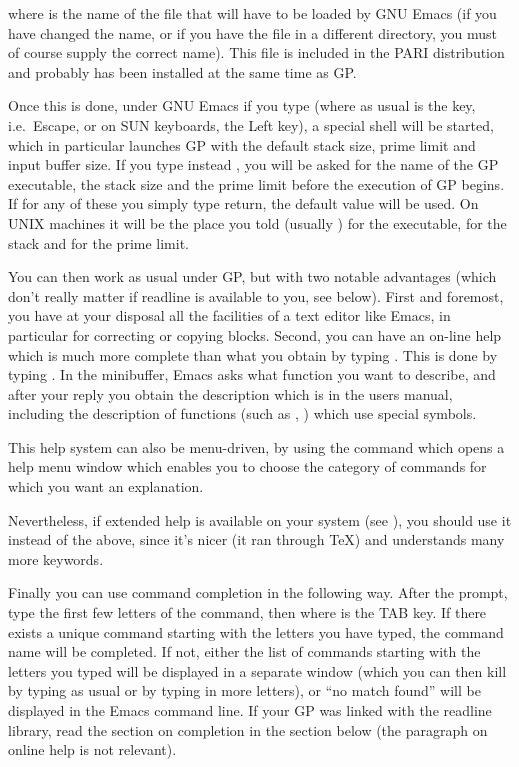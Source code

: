 \noindent where  is the name of the file that
will have to be loaded by GNU Emacs (if you have changed the name, or if
you have the file in a different directory, you must of course supply the
correct name). This file is included in the PARI distribution and probably
has been installed at the same time as GP.

Once this is done, under GNU Emacs if you type  (where as usual
 is the  key, i.e.~Escape, or on SUN keyboards, the Left
key), a special shell will be started, which in particular launches GP with
the default stack size, prime limit and input buffer size. If you type
instead , you will be asked for the name of the GP
executable, the stack size and the prime limit before the execution of GP
begins. If for any of these you simply type return, the default value will
be used. On UNIX machines it will be the place you told 
(usually ) for the executable,  for the
stack and  for the prime limit.

\smallskip
  You can then work as usual under GP, but with two notable advantages (which
don't really matter if readline is available to you, see below). First and
foremost, you have at your disposal all the facilities of a text editor like
Emacs, in particular for correcting or copying blocks. Second, you can have
an on-line help which is much more complete than what you obtain by typing
. This is done by typing . In the minibuffer, Emacs asks
what function you want to describe, and after your reply you obtain the
description which is in the users manual, including the description of
functions (such as \kbd{\bs}, \kbd{\%}) which use special symbols.

  This help system can also be menu-driven, by using the command
 which opens a help menu window which enables you to choose
the category of commands for which you want an explanation.

  Nevertheless, if extended help is available on your system (see
), you should use it instead of the above, since it's
nicer (it ran through \TeX) and understands many more keywords.

  Finally you can use command completion in the following way. After the
prompt, type the first few letters of the command, then  where
 is the TAB key. If there exists a unique command starting with
the letters you have typed, the command name will be completed. If not,
either the list of commands starting with the letters you typed will be
displayed in a separate window (which you can then kill by typing as usual
 or by typing in more letters), or ``no match found'' will be
displayed in the Emacs command line. If your GP was linked with the readline
library, read the section on completion in the section below (the paragraph
on online help is not relevant).

